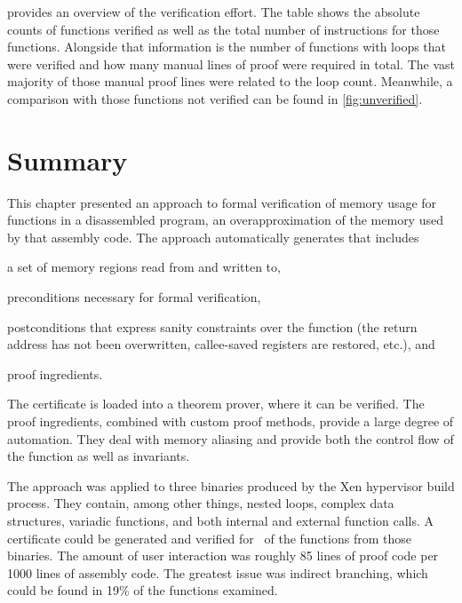 provides an overview of the verification effort.
The table shows the absolute counts of functions verified
as well as the total number of instructions for those functions.
Alongside that information is the number of functions with loops
that were verified and how many manual lines of proof were required in total.
The vast majority of those manual proof lines were related to the loop count.
Meanwhile, a comparison with those functions not verified
can be found in \cref{fig:unverified}.

\section{Summary}
This chapter presented an approach to formal verification of memory usage
for functions in a disassembled program,
an overapproximation of the memory used by that assembly code.
The approach automatically generates  that includes
\begin{enumerate*}
  \item a set of memory regions read from and written to,
  \item preconditions necessary for formal verification,
  \item postconditions that express sanity constraints over the function
  (the return address has not been overwritten,
  callee-saved registers are restored, etc.), and
  \item proof ingredients.
\end{enumerate*}
The certificate is loaded into a theorem prover, where it can be verified.
The proof ingredients, combined with custom proof methods,
provide a large degree of automation.
They deal with memory aliasing and provide both the control flow of the function
as well as invariants.

The approach was applied to three binaries produced by the Xen hypervisor build process.
They contain, among other things, nested loops,
complex data structures, variadic functions,
and both internal and external function calls.
A certificate could be generated and verified
for \xenpercentage\ of the functions from those binaries.
The amount of user interaction was roughly 85 lines of proof code
per \num{1000} lines of assembly code.
The greatest issue was indirect branching,
which could be found in 19\% of the functions examined.
